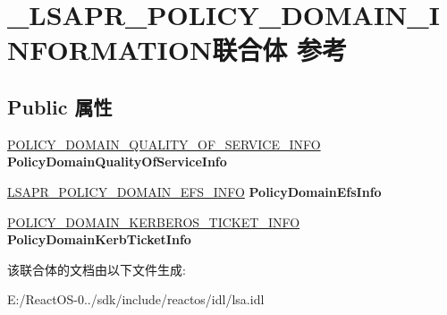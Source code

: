 \hypertarget{union___l_s_a_p_r___p_o_l_i_c_y___d_o_m_a_i_n___i_n_f_o_r_m_a_t_i_o_n}{}\section{\+\_\+\+L\+S\+A\+P\+R\+\_\+\+P\+O\+L\+I\+C\+Y\+\_\+\+D\+O\+M\+A\+I\+N\+\_\+\+I\+N\+F\+O\+R\+M\+A\+T\+I\+O\+N联合体 参考}
\label{union___l_s_a_p_r___p_o_l_i_c_y___d_o_m_a_i_n___i_n_f_o_r_m_a_t_i_o_n}
\subsection*{Public 属性}
\begin{DoxyCompactItemize}
\item 
\mbox{\label{union___l_s_a_p_r___p_o_l_i_c_y___d_o_m_a_i_n___i_n_f_o_r_m_a_t_i_o_n_a679e952d4cc665db98145a289e2e5c75}} 
\hyperlink{struct___p_o_l_i_c_y___l_o_c_a_l___q_u_a_l_i_t_y___o_f___s_e_r_v_i_c_e___i_n_f_o}{P\+O\+L\+I\+C\+Y\+\_\+\+D\+O\+M\+A\+I\+N\+\_\+\+Q\+U\+A\+L\+I\+T\+Y\+\_\+\+O\+F\+\_\+\+S\+E\+R\+V\+I\+C\+E\+\_\+\+I\+N\+FO} {\bfseries Policy\+Domain\+Quality\+Of\+Service\+Info}
\item 
\mbox{\label{union___l_s_a_p_r___p_o_l_i_c_y___d_o_m_a_i_n___i_n_f_o_r_m_a_t_i_o_n_a25b7a4fe5fc9df565a87209c1cc8a6e6}} 
\hyperlink{struct___l_s_a_p_r___p_o_l_i_c_y___d_o_m_a_i_n___e_f_s___i_n_f_o}{L\+S\+A\+P\+R\+\_\+\+P\+O\+L\+I\+C\+Y\+\_\+\+D\+O\+M\+A\+I\+N\+\_\+\+E\+F\+S\+\_\+\+I\+N\+FO} {\bfseries Policy\+Domain\+Efs\+Info}
\item 
\mbox{\label{union___l_s_a_p_r___p_o_l_i_c_y___d_o_m_a_i_n___i_n_f_o_r_m_a_t_i_o_n_aea01b7db055dbf5447f1ac14a36fc606}} 
\hyperlink{struct___p_o_l_i_c_y___d_o_m_a_i_n___k_e_r_b_e_r_o_s___t_i_c_k_e_t___i_n_f_o}{P\+O\+L\+I\+C\+Y\+\_\+\+D\+O\+M\+A\+I\+N\+\_\+\+K\+E\+R\+B\+E\+R\+O\+S\+\_\+\+T\+I\+C\+K\+E\+T\+\_\+\+I\+N\+FO} {\bfseries Policy\+Domain\+Kerb\+Ticket\+Info}
\end{DoxyCompactItemize}


该联合体的文档由以下文件生成\+:\begin{DoxyCompactItemize}
\item 
E\+:/\+React\+O\+S-\/0../sdk/include/reactos/idl/lsa.\+idl\end{DoxyCompactItemize}
